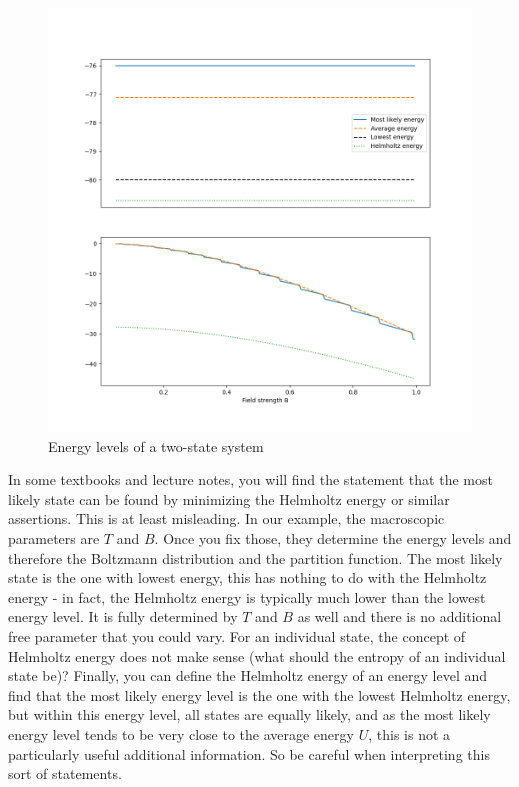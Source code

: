\documentclass[a4paper, draft]{article}
\theoremstyle{own}
\theoremstyle{remark}
\begin{document}
\begin{figure}[ht]
	\centering
	\includegraphics[scale=0.5]{TwoStateSystemEnergyLevels.png}
	\caption{Energy levels of a two-state system}
	\label{fig:TwoStateEnergyLevels}
\end{figure}

In some textbooks and lecture notes, you will find the statement that the most likely state can be found by minimizing the Helmholtz energy or similar assertions. This is at least misleading. In our example, the macroscopic parameters are $T$ and $B$. Once you fix those, they determine the energy levels and therefore the Boltzmann distribution and the partition function. The most likely state is the one with lowest energy, this has nothing to do with the Helmholtz energy - in fact, the Helmholtz energy is typically much lower than the lowest energy level. It is fully determined by $T$ and $B$ as well and there is no additional free parameter that you could vary. For an individual state, the concept of Helmholtz energy does not make sense (what should the entropy of an individual state be)? Finally, you can define the Helmholtz energy of an energy level and find that the most likely energy level is the one with the lowest Helmholtz energy, but within this energy level, all states are equally likely, and as the most likely energy level tends to be very close to the average energy $U$, this is not a particularly useful additional information. So be careful when interpreting this sort of statements. 
\end{document}
